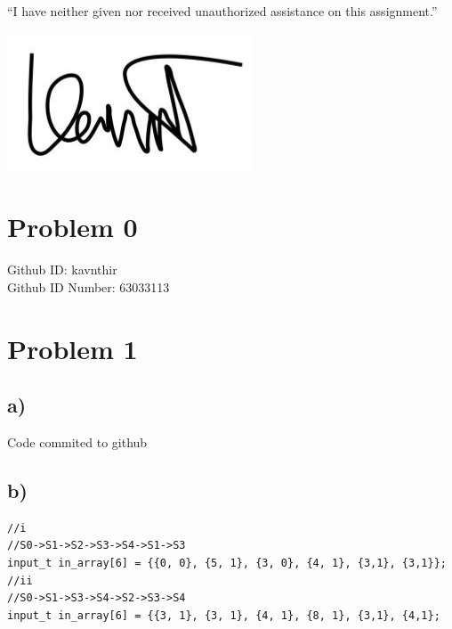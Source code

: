 \documentclass{article}
\begin{document}
\begin{center}
    “I have neither given nor received unauthorized assistance on this assignment.”
    
    \includegraphics[width = .1\textwidth]{Signature.jpg}
\end{center}
\section*{Problem 0}
\begin{center}
    Github ID: kavnthir\\
    Github ID Number: 63033113
\end{center} 
\section*{Problem 1}
\subsection*{a)}
\begin{center}
    Code commited to github
\end{center}
\subsection*{b)}
\begin{center}
        \lstset{language=C}
        \lstset{frame=lines}
        \lstset{basicstyle=\footnotesize}
        \begin{lstlisting}
//i
//S0->S1->S2->S3->S4->S1->S3
input_t in_array[6] = {{0, 0}, {5, 1}, {3, 0}, {4, 1}, {3,1}, {3,1}};
//ii
//S0->S1->S3->S4->S2->S3->S4
input_t in_array[6] = {{3, 1}, {3, 1}, {4, 1}, {8, 1}, {3,1}, {4,1};
        \end{lstlisting}
\end{center}
\end{document}
